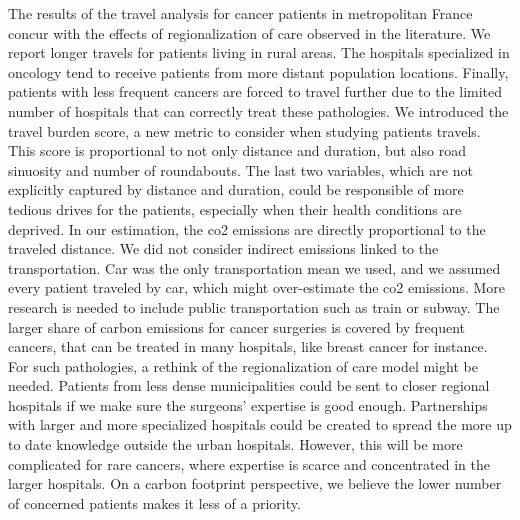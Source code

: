 The results of the travel analysis for cancer patients in metropolitan France concur with the effects of regionalization of care observed in the literature. We report longer travels for patients living in rural areas. The hospitals specialized in oncology tend to receive patients from more distant population locations. Finally, patients with less frequent cancers are forced to travel further due to the limited number of hospitals that can correctly treat these pathologies. We introduced the travel burden score, a new metric to consider when studying patients travels. This score is proportional to not only distance and duration, but also road sinuosity and number of roundabouts. The last two variables, which are not explicitly captured by distance and duration, could be responsible of more tedious drives for the patients, especially when their health conditions are deprived. In our estimation, the \ac{co2} emissions are directly proportional to the traveled distance. We did not consider indirect emissions linked to the transportation. Car was the only transportation mean we used, and we assumed every patient traveled by car, which might over-estimate the \ac{co2} emissions. More research is needed to include public transportation such as train or subway. The larger share of carbon emissions for cancer surgeries is covered by frequent cancers, that can be treated in many hospitals, like breast cancer for instance. For such pathologies, a rethink of the regionalization of care model might be needed. Patients from less dense municipalities could be sent to closer regional hospitals if we make sure the surgeons' expertise is good enough. Partnerships with larger and more specialized hospitals could be created to spread the more up to date knowledge outside the urban hospitals. However, this will be more complicated for rare cancers, where expertise is scarce and concentrated in the larger hospitals. On a carbon footprint perspective, we believe the lower number of concerned patients makes it less of a priority.
